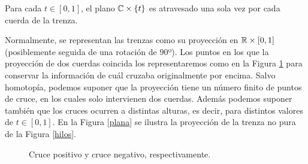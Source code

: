 \documentclass[TFG.tex]{subfiles}
\begin{document}
\begin{observacion}
Para cada $t\in[0,1]$, el plano $\mathbb{C}\times\{t\}$ es atravesado una sola vez por cada cuerda de la trenza. 
\end{observacion}

Normalmente, se representan las trenzas como su proyección en $\mathbb{R}\times[0,1]$ (posiblemente seguida de una rotación de 90º). Los puntos en los que la proyección de dos cuerdas coincida los representaremos como en la Figura \ref{cruce} para conservar la información de cuál cruzaba originalmente por encima. Salvo homotopía, podemos suponer que la proyección tiene un número finito de puntos de cruce, en los cuales solo intervienen dos cuerdas. Además podemos suponer también que los cruces ocurren a distintas alturas, es decir, para distintos valores de $t\in[0,1]$. En la Figura \ref{plana} se ilustra la proyección de la trenza no pura de la Figura \ref{hilos}. 
\begin{figure}[h!]
\centering
{}

\caption{Cruce positivo y cruce negativo, respectivamente.}\label{cruce}
\end{figure}
\end{document}
